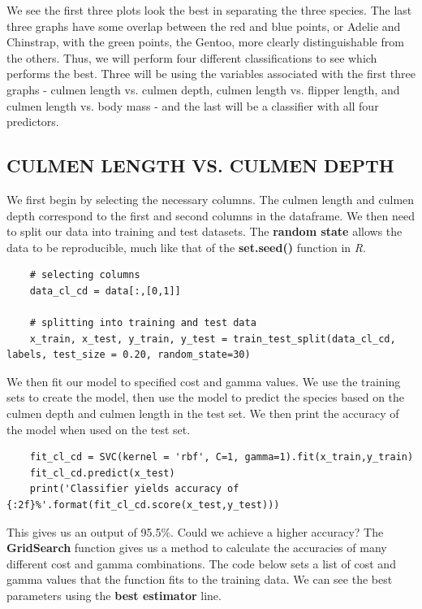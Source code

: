 \documentclass[12pt]{article}
\begin{document}
We see the first three plots look the best in separating the three species. The last three graphs have some overlap between the red and blue points, or Adelie and Chinstrap, with the green points, the Gentoo, more clearly distinguishable from the others. Thus, we will perform four different classifications to see which performs the best. Three will be using the variables associated with the first three graphs - culmen length vs. culmen depth, culmen length vs. flipper length, and culmen length vs. body mass - and the last will be a classifier with all four predictors.

\subsection{CULMEN LENGTH VS. CULMEN DEPTH}

We first begin by selecting the necessary columns. The culmen length and culmen depth correspond to the first and second columns in the dataframe. We then need to split our data into training and test datasets. The \textbf{random state} allows the data to be reproducible, much like that of the \textbf{set.seed()} function in \textit{R}.

\begin{verbatim}
    # selecting columns
    data_cl_cd = data[:,[0,1]]

    # splitting into training and test data
    x_train, x_test, y_train, y_test = train_test_split(data_cl_cd, labels, test_size = 0.20, random_state=30)
\end{verbatim}

We then fit our model to specified cost and gamma values. We use the training sets to create the model, then use the model to predict the species based on the culmen depth and culmen length in the test set. We then print the accuracy of the model when used on the test set.

\begin{verbatim}
    fit_cl_cd = SVC(kernel = 'rbf', C=1, gamma=1).fit(x_train,y_train)
    fit_cl_cd.predict(x_test)
    print('Classifier yields accuracy of {:2f}%'.format(fit_cl_cd.score(x_test,y_test)))   
\end{verbatim}

This gives us an output of 95.5\(\%\). Could we achieve a higher accuracy? The \textbf{GridSearch} function gives us a method to calculate the accuracies of many different cost and gamma combinations. The code below sets a list of cost and gamma values that the function fits to the training data. We can see the best parameters using the \textbf{best estimator} line.
\end{document}
